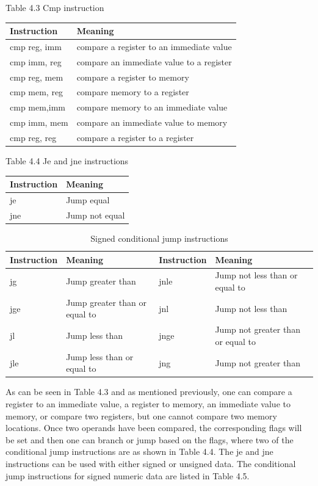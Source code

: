 \documentclass[10pt]{book}
\begin{document}
Table 4.3 Cmp instruction

\begin{center}
\begin{tabular}{|l|l|}
\hline
Instruction & Meaning \\
\hline
cmp reg, imm & compare a register to an immediate value \\
\hline
cmp imm, reg & compare an immediate value to a register \\
\hline
cmp reg, mem & compare a register to memory \\
\hline
cmp mem, reg & compare memory to a register \\
\hline
cmp mem,imm & compare memory to an immediate value \\
\hline
cmp imm, mem & compare an immediate value to memory \\
\hline
cmp reg, reg & compare a register to a register \\
\hline
\end{tabular}
\end{center}

Table 4.4 Je and jne instructions
\begin{table}[ht]
\centering
\begin{tabular}{|l|l|}
\hline
Instruction & Meaning \\
\hline
je & Jump equal \\
\hline
jne & Jump not equal \\
\hline
\end{tabular}
\end{table}

\begin{table}[ht]
\centering
\caption{Signed conditional jump instructions}
\begin{tabular}{|l|l|l|l|}
\hline
Instruction & Meaning & Instruction & Meaning \\
\hline
jg & Jump greater than & jnle & Jump not less than or equal to \\
\hline
jge & Jump greater than or equal to & jnl & Jump not less than \\
\hline
jl & Jump less than & jnge & Jump not greater than or equal to \\
jle & Jump less than or equal to & jng & Jump not greater than \\
\hline
\end{tabular}
\end{table}

As can be seen in Table 4.3 and as mentioned previously, one can compare a register to an immediate value, a register to memory, an immediate value to memory, or compare two registers, but one cannot compare two memory locations. Once two operands have been compared, the corresponding flags will be set and then one can branch or jump based on the flags, where two of the conditional jump instructions are as shown in Table 4.4.
The je and jne instructions can be used with either signed or unsigned data. The conditional jump instructions for signed numeric data are listed in Table 4.5.
\end{document}
